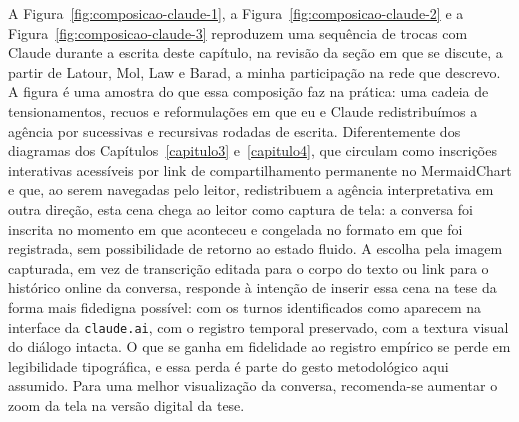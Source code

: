 A Figura~\ref{fig:composicao-claude-1}, a Figura~\ref{fig:composicao-claude-2} e a Figura~\ref{fig:composicao-claude-3} reproduzem uma sequência de trocas com Claude durante a escrita deste capítulo, na revisão da seção em que se discute, a partir de Latour, Mol, Law e Barad, a minha participação na rede que descrevo. A figura é uma amostra do que essa composição faz na prática: uma cadeia de tensionamentos, recuos e reformulações em que eu e Claude redistribuímos a agência por sucessivas e recursivas rodadas de escrita. Diferentemente dos diagramas dos Capítulos~\ref{capitulo3} e~\ref{capitulo4}, que circulam como inscrições interativas acessíveis por link de compartilhamento permanente no MermaidChart e que, ao serem navegadas pelo leitor, redistribuem a agência interpretativa em outra direção, esta cena chega ao leitor como captura de tela: a conversa foi inscrita no momento em que aconteceu e congelada no formato em que foi registrada, sem possibilidade de retorno ao estado fluido. A escolha pela imagem capturada, em vez de transcrição editada para o corpo do texto ou link para o histórico online da conversa, responde à intenção de inserir essa cena na tese da forma mais fidedigna possível: com os turnos identificados como aparecem na interface da \texttt{claude.ai}, com o registro temporal preservado, com a textura visual do diálogo intacta. O que se ganha em fidelidade ao registro empírico se perde em legibilidade tipográfica, e essa perda é parte do gesto metodológico aqui assumido. Para uma melhor visualização da conversa, recomenda-se aumentar o zoom da tela na versão digital da tese.

